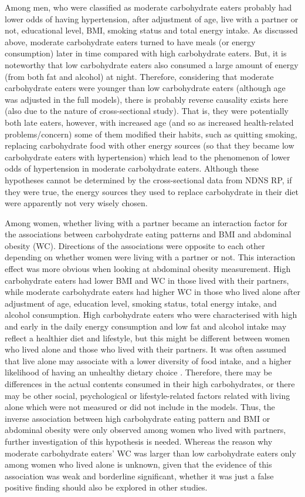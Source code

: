 Among men, who were classified as moderate carbohydrate eaters probably had lower odds of having hypertension, after adjustment of age, live with a partner or not, educational level, BMI, smoking status and total energy intake. As discussed above, moderate carbohydrate eaters turned to have meals (or energy consumption) later in time compared with high carbohydrate eaters. But, it is noteworthy that low carbohydrate eaters also consumed a large amount of energy (from both fat and alcohol) at night. Therefore, considering that moderate carbohydrate eaters were younger than low carbohydrate eaters (although age was adjusted in the full models), there is probably reverse causality exists here (also due to the nature of cross-sectional study). That is, they were potentially both late eaters, however, with increased age (and so as increased health-related problems/concern) some of them modified their habits, such as quitting smoking, replacing carbohydrate food with other energy sources (so that they became low carbohydrate eaters with hypertension) which lead to the phenomenon of lower odds of hypertension in moderate carbohydrate eaters. Although these hypotheses cannot be determined by the cross-sectional data from NDNS RP, if they were true, the energy sources they used to replace carbohydrate in their diet were apparently not very wisely chosen. 

Among women, whether living with a partner became an interaction factor for the associations between carbohydrate eating patterns and BMI and abdominal obesity (WC). Directions of the associations were opposite to each other depending on whether women were living with a partner or not. This interaction effect was more obvious when looking at abdominal obesity measurement. High carbohydrate eaters had lower BMI and WC in those lived with their partners, while moderate carbohydrate eaters had higher WC in those who lived alone after adjustment of age, education level, smoking status, total energy intake, and alcohol consumption. High carbohydrate eaters who were characterised with high and early in the daily energy consumption and low fat and alcohol intake may reflect a healthier diet and lifestyle, but this might be different between women who lived alone and those who lived with their partners. It was often assumed that live alone may associate with a lower diversity of food intake, and a higher likelihood of having an unhealthy dietary choice \parencite{hanna2015relationship}. Therefore, there may be differences in the actual contents consumed in their high carbohydrates, or there may be other social, psychological or lifestyle-related factors related with living alone which were not measured or did not include in the models. Thus, the inverse association between high carbohydrate eating pattern and BMI or abdominal obesity were only observed among women who lived with partners, further investigation of this hypothesis is needed. Whereas the reason why moderate carbohydrate eaters' WC was larger than low carbohydrate eaters only among women who lived alone is unknown, given that the evidence of this association was weak and borderline significant, whether it was just a false positive finding should also be explored in other studies.

